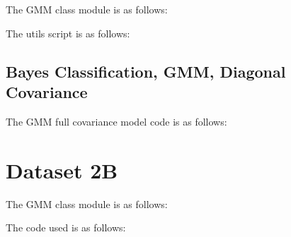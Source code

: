 \documentclass[11pt,a4paper]{article}
\newcommand{\noi}{\noindent}
\begin{document}
\noi
The GMM class module is as follows:\vspace{-1em}


\noi
The utils script is as follows:\vspace{-1em}



\subsection{Bayes Classification, GMM, Diagonal Covariance}
The GMM full covariance model code is as follows: \vspace{-1em}


\section{Dataset 2B}
The GMM class module is as follows:\vspace{-1em}


The code used is as follows:\vspace{-1em}

\end{document}

